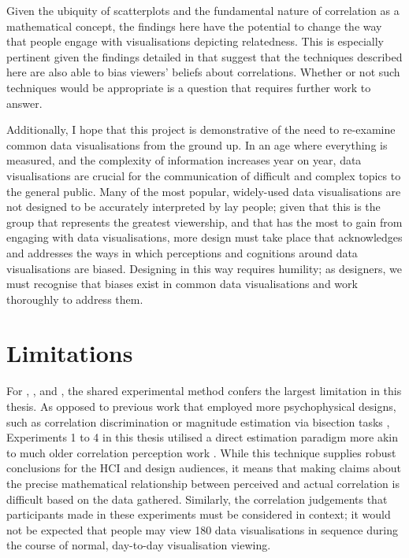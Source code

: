 \documentclass[../main.tex]{subfiles}
\begin{document}
Given the ubiquity of scatterplots and the fundamental nature of
correlation as a mathematical concept, the findings here have the
potential to change the way that people engage with visualisations
depicting relatedness. This is especially pertinent given the findings
detailed in  that suggest that the techniques
described here are also able to bias viewers' beliefs about
correlations. Whether or not such techniques would be appropriate is a
question that requires further work to answer.

Additionally, I hope that this project is demonstrative of the need to
re-examine common data visualisations from the ground up. In an age
where everything is measured, and the complexity of information
increases year on year, data visualisations are crucial for the
communication of difficult and complex topics to the general public.
Many of the most popular, widely-used data visualisations are not
designed to be accurately interpreted by lay people; given that this is
the group that represents the greatest viewership, and that has the most
to gain from engaging with data visualisations, more design must take
place that acknowledges and addresses the ways in which perceptions and
cognitions around data visualisations are biased. Designing in this way
requires humility; as designers, we must recognise that biases exist in
common data visualisations and work thoroughly to address them.

\section{Limitations}\label{limitations}

For , , and
, the shared experimental method
confers the largest limitation in this thesis. As opposed to previous
work that employed more psychophysical designs, such as correlation
discrimination or magnitude estimation via bisection tasks
\cite{rensink_2010, rensink_2017}, Experiments 1 to 4 in this thesis
utilised a direct estimation paradigm more akin to much older
correlation perception work
\cite{strahan_1978, bobko_1979, cleveland_1982,
lane_1985, lauer_1989, collyer_1990, meyer_1992}. While this technique
supplies robust conclusions for the HCI and design audiences, it means
that making claims about the precise mathematical relationship between
perceived and actual correlation is difficult based on the data
gathered. Similarly, the correlation judgements that participants made
in these experiments must be considered in context; it would not be
expected that people may view 180 data visualisations in sequence during
the course of normal, day-to-day visualisation viewing.
\end{document}

